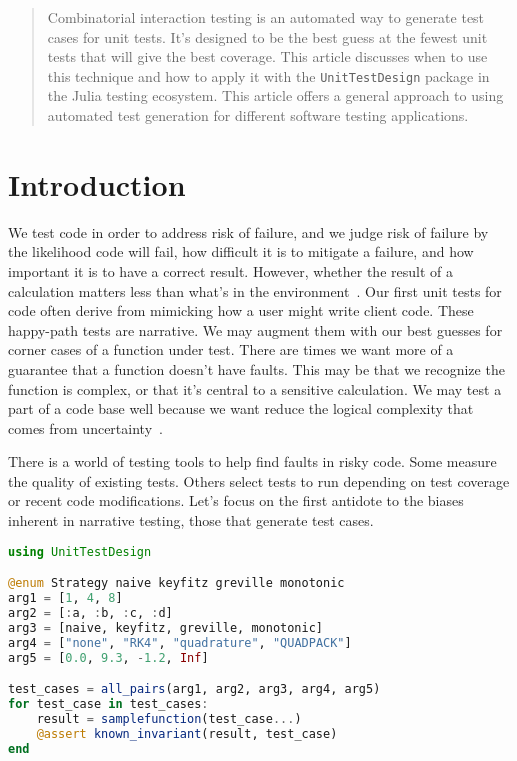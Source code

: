 \documentclass{juliacon}
\newcommand{\utd}{\texttt{UnitTestDesign}\xspace}
\begin{document}


\maketitle

\begin{abstract}
Combinatorial interaction testing is an automated way to generate test cases for unit tests. It's designed to be the best guess at the fewest unit tests that will give the best coverage. This article discusses when to use this technique and how to apply it with the \utd package in the Julia testing ecosystem. This article offers a general approach to using automated test generation for different software testing applications.
\end{abstract}

\section{Introduction}

We test code in order to address risk of failure, and we judge risk of failure by the likelihood code will fail, how difficult it is to mitigate a failure, and how important it is to have a correct result. However, whether the result of a calculation matters less than what's in the environment~\cite{Wiklund2017-ms}.
\vskip 6pt
Our first unit tests for code often derive from mimicking how a user might write client code. These happy-path tests are narrative. We may augment them with our best guesses for corner cases of a function under test. There are times we want more of a guarantee that a function doesn't have faults. This may be that we recognize the function is complex, or that it's central to a sensitive calculation. We may test a part of a code base well because we want reduce the logical complexity that comes from uncertainty~\cite{Sha2001-ie}.

\vskip 6pt
There is a world of testing tools to help find faults in risky code. Some measure the quality of existing tests. Others select tests to run depending on test coverage or recent code modifications. Let's focus on the first antidote to the biases inherent in narrative testing, those that generate test cases.

\vskip 6pt
\begin{lstlisting}[language=Julia]
using UnitTestDesign

@enum Strategy naive keyfitz greville monotonic
arg1 = [1, 4, 8]
arg2 = [:a, :b, :c, :d]
arg3 = [naive, keyfitz, greville, monotonic]
arg4 = ["none", "RK4", "quadrature", "QUADPACK"]
arg5 = [0.0, 9.3, -1.2, Inf]

test_cases = all_pairs(arg1, arg2, arg3, arg4, arg5)
for test_case in test_cases:
    result = samplefunction(test_case...)
    @assert known_invariant(result, test_case)
end
\end{lstlisting}
\end{document}

